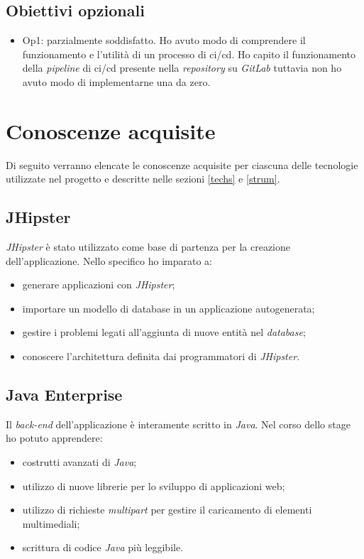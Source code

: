 \subsection{Obiettivi opzionali}
\begin{itemize}
    \item Op1: parzialmente soddisfatto. Ho avuto modo di comprendere il funzionamento e l'utilità di un processo di \gls{ci}/\gls{cd}. Ho capito il funzionamento della \textit{pipeline} di \gls{ci}/\gls{cd} presente nella \textit{repository} su \textit{GitLab} tuttavia non ho avuto modo di implementarne una da zero.
\end{itemize}

\section{Conoscenze acquisite}
Di seguito verranno elencate le conoscenze acquisite per ciascuna delle tecnologie utilizzate nel progetto e descritte nelle sezioni \ref{techs} e \ref{strum}.

\subsection{JHipster}
\textit{JHipster} è stato utilizzato come base di partenza per la creazione dell'applicazione. Nello specifico ho imparato a:
\begin{itemize}
    \item generare applicazioni con \textit{JHipster};
    \item importare un modello di database in un applicazione autogenerata;
    \item gestire i problemi legati all'aggiunta di nuove entità nel \textit{database};
    \item conoscere l'architettura definita dai programmatori di \textit{JHipster}.
\end{itemize}

\subsection{Java Enterprise}
Il \textit{back-end} dell'applicazione è interamente scritto in \textit{Java}. Nel corso dello stage ho potuto apprendere:
\begin{itemize}
    \item costrutti avanzati di \textit{Java};
    \item utilizzo di nuove librerie per lo sviluppo di applicazioni web;
    \item utilizzo di richieste \textit{multipart} per gestire il caricamento di elementi multimediali;
    \item scrittura di codice \textit{Java} più leggibile.
\end{itemize}

